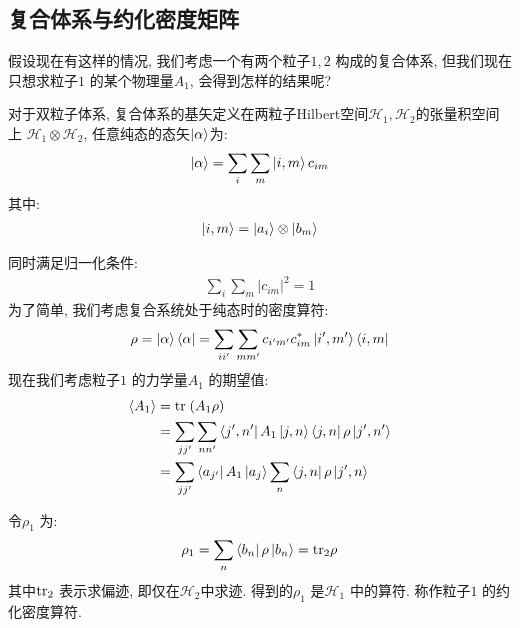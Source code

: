\subsection{复合体系与约化密度矩阵}
假设现在有这样的情况, 我们考虑一个有两个粒子$1,2$ 构成的复合体系, 但我们现在
只想求粒子$1$ 的某个物理量$A_1$, 会得到怎样的结果呢?

对于双粒子体系, 复合体系的基矢定义在两粒子Hilbert空间$\mathcal{H}_{1}, \mathcal{H}_{2}$的张量积空间上
$\mathcal{H}_{1}\otimes \mathcal{H}_{2}$, 任意纯态的态矢$\ket{\alpha}$为:
\begin{equation}
  \begin{aligned}
    \ket{\alpha} = \sum_{i} \sum_{m} \ket{i,m} c_{im}
  \end{aligned}
\end{equation}
其中:
\begin{equation}
  \begin{aligned}
    \ket{i,m} = \ket{a_{i}}\otimes \ket{b_{m}}
  \end{aligned}
\end{equation}

同时满足归一化条件:
\begin{equation}
  \begin{aligned}
    \sum_{i} \sum_{m} |c_{im}|^{2} = 1
  \end{aligned}
\end{equation}
为了简单, 我们考虑复合系统处于纯态时的密度算符:
\begin{equation}
  \begin{aligned}
    \rho = \ket{\alpha}\bra{\alpha} = \sum_{ii'}\sum_{mm'}c_{i'm'}c_{im}^{*}\ket{i', m'}\bra{i, m}
  \end{aligned}
\end{equation}
现在我们考虑粒子$1$ 的力学量$A_1$ 的期望值:
\begin{equation}
  \begin{aligned}
    \langle A_1 \rangle &= {\rm tr}\; (A_1 \rho) \\
                        &= \sum_{jj'}\sum_{nn'}\bra{j', n'}A_1\ket{j, n}\bra{j, n}\rho \ket{j', n'}\\
                        &= \sum_{jj'}\bra{a_{j'}}A_1\ket{a_{j}}\sum_{n}\bra{j,n}\rho \ket{j', n}
  \end{aligned}
\end{equation}

令$\rho_1$ 为:
\begin{equation}
  \begin{aligned}
    \rho_1 = \sum_{n} \bra{b_{n}}\rho \ket{b_{n}} = {\rm tr}_2 \rho
  \end{aligned}
\end{equation}
其中${\rm tr}_{2}$ 表示求偏迹, 即仅在$\mathcal{H}_{2}$中求迹. 得到的$\rho_1$ 是$\mathcal{H}_{1}$ 中的算符.
称作粒子$1$ 的约化密度算符.

